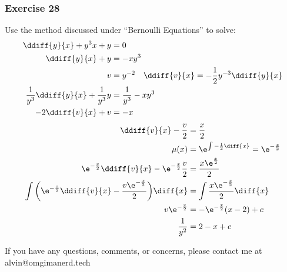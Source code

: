 \documentclass{math}
\begin{document}
\subsubsection*{Exercise 28}
Use the method discussed under ``Bernoulli Equations'' to solve:
\begin{align*}
  \ddiff{y}{x}+y^3x+y &= 0 \\
  \ddiff{y}{x}+y &= -xy^3 \\
  v &= y^{-2} \quad \ddiff{v}{x} = -\frac{1}{2}y^{-3}\ddiff{y}{x} \\
  \frac{1}{y^3}\ddiff{y}{x}+\frac{1}{y^3}y &= \frac{1}{y^3}-xy^3 \\
  -2\ddiff{v}{x}+v &= -x
\end{align*}
\begin{align*}
  \ddiff{v}{x}-\frac{v}{2} &= \frac{x}{2} \\
  \mu(x) &= \e^{\int-\frac{1}{2}\diff{x}} = \e^{-\frac{x}{2}} \\
  \e^{-\frac{x}{2}}\ddiff{v}{x}-\e^{-\frac{x}{2}}\frac{v}{2} &=
    \frac{x\e^{\frac{x}{2}}}{2} \\
  \int\bigg(\e^{-\frac{x}{2}}\ddiff{v}{x}-\frac{v\e^{-\frac{x}{2}}}{2}\bigg)
    \diff{x} &= \int\frac{x\e^{-\frac{x}{2}}}{2}\diff{x} \\
  v\e^{-\frac{x}{2}} &= -\e^{-\frac{x}{2}}(x-2)+c \\
  \frac{1}{y^2} &= 2-x+c
\end{align*}

\begin{center}
  If you have any questions, comments, or concerns, please contact me at
  alvin@omgimanerd.tech
\end{center}
\end{document}
